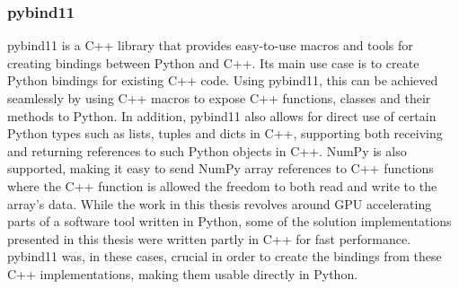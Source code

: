 \subsubsection{pybind11} \label{background:implementation_tools_and_libraries:pybind11}
pybind11 \cite{pybind11} is a C++ library that provides easy-to-use macros and tools for creating bindings between Python and C++. 
Its main use case is to create Python bindings for existing C++ code.
Using pybind11, this can be achieved seamlessly by using C++ macros to expose C++ functions, classes and their methods to Python.
In addition, pybind11 also allows for direct use of certain Python types such as lists, tuples and dicts in C++, supporting both receiving and returning references to such Python objects in C++.
NumPy is also supported, making it easy to send NumPy array references to C++ functions where the C++ function is allowed the freedom to both read and write to the array's data.
While the work in this thesis revolves around GPU accelerating parts of a software tool written in Python, some of the solution implementations presented in this thesis were written partly in C++ for fast performance.
pybind11 was, in these cases, crucial in order to create the bindings from these C++ implementations, making them usable directly in Python.
